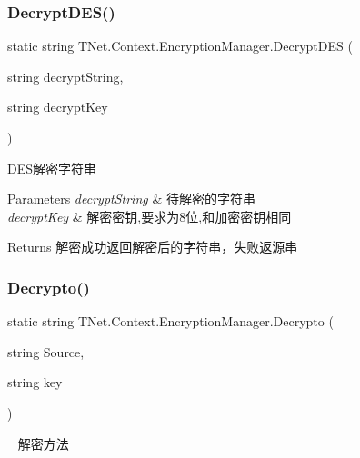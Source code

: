 \subsubsection{\texorpdfstring{Decrypt\+D\+E\+S()}{DecryptDES()}}
{\footnotesize\ttfamily static string T\+Net.\+Context.\+Encryption\+Manager.\+Decrypt\+D\+ES (\begin{DoxyParamCaption}\item[{string}]{decrypt\+String,  }\item[{string}]{decrypt\+Key }\end{DoxyParamCaption})\hspace{0.3cm}{\ttfamily [static]}}



D\+E\+S解密字符串 


\begin{DoxyParams}{Parameters}
{\em decrypt\+String} & 待解密的字符串\\
\hline
{\em decrypt\+Key} & 解密密钥,要求为8位,和加密密钥相同\\
\hline
\end{DoxyParams}
\begin{DoxyReturn}{Returns}
解密成功返回解密后的字符串，失败返源串
\end{DoxyReturn}
\mbox{\label{class_t_net_1_1_context_1_1_encryption_manager_ae05516dae4bcbedf23f430ffaa53d9f7}} 
\subsubsection{\texorpdfstring{Decrypto()}{Decrypto()}}
{\footnotesize\ttfamily static string T\+Net.\+Context.\+Encryption\+Manager.\+Decrypto (\begin{DoxyParamCaption}\item[{string}]{Source,  }\item[{string}]{key }\end{DoxyParamCaption})\hspace{0.3cm}{\ttfamily [static]}}



~\newline
解密方法 ~\newline



